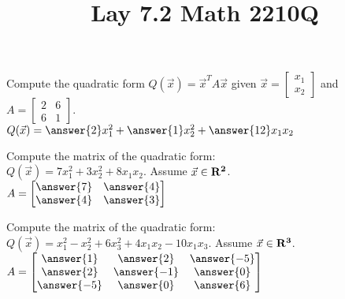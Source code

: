\documentclass{ximera}
\newcommand{\RR}{\bf R}
\begin{document}
  	\title{Lay 7.2  \hfill Math 2210Q} 
  	
  	\begin{question} 
  		Compute the quadratic form $Q(\vec{x})= \vec{x}^TA\vec{x}$ given $\vec{x} =\begin{bmatrix}
  		x_1\\ x_2
  		\end{bmatrix}$ and $A = \begin{bmatrix} 2&6\\6&1\end{bmatrix}$.\vspace{10pt}\\
  	
  		$Q(\vec{x}) = \answer{2}x_1^2 +\answer{1}x_2^2  +\answer{12}x_1x_2 $
  		
  		
  		
  	\end{question}
  	\begin{question} 
  		Compute the matrix of the quadratic form:\\ $Q(\vec{x}) = 7x_1^2 +3x_2^2  +8x_1x_2 $. Assume $\vec{x} \in \RR^2$.\vspace{10pt}\\
  		
  		$A = \begin{bmatrix} \answer{7} & \answer{4}\\ \answer{4} & \answer{3}\end{bmatrix}$
  		
  		
  	
  	\end{question}
  \begin{question} 
  	Compute the matrix of the quadratic form:\\ $Q(\vec{x}) = x_1^2 -x_2^2 +6x_3^2 +4x_1x_2-10x_1x_3 $. Assume $\vec{x} \in \RR^3$.\vspace{10pt}\\
  	
  	$A = \begin{bmatrix} \answer{1} & \answer{2}& \answer{-5}\\ \answer{2} & \answer{-1}& \answer{0}\\  \answer{-5}& \answer{0}& \answer{6}\end{bmatrix}$
  	
  	
  	
  \end{question}
\end{document}
